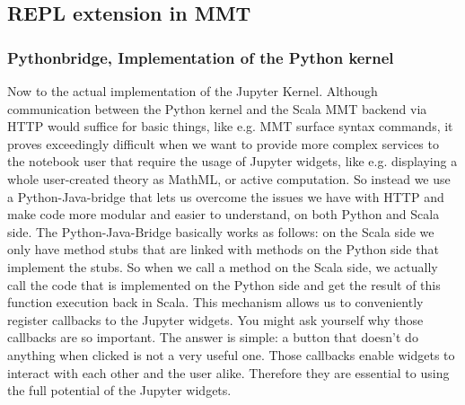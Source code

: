 \documentclass[book]{deliverablereport}
\begin{document}
\subsection{REPL extension in MMT}

\subsubsection{Pythonbridge, Implementation of the Python kernel}
Now to the actual implementation of the Jupyter Kernel. Although communication between 
the Python kernel and the Scala MMT backend via HTTP would suffice for basic things,
like e.g. MMT surface syntax commands, it proves exceedingly difficult when we want to 
provide more complex services to the notebook user that require the usage of Jupyter widgets,
like e.g. displaying a whole user-created theory as MathML, or active computation. 
So instead we use a Python-Java-bridge that lets us overcome the issues we have with HTTP and
make code more modular and easier to understand, on both Python and Scala side.
The Python-Java-Bridge basically works as follows: on the Scala side we only have method stubs
that are linked with methods on the Python side that implement the stubs. So when we call 
a method on the Scala side, we actually call the code that is implemented on the Python side 
and get the result of this function execution back in Scala. This mechanism allows us to 
conveniently register callbacks to the Jupyter widgets. You might ask yourself why those callbacks 
are so important. The answer is simple: a button that doesn't do anything when clicked is not 
a very useful one. Those callbacks enable widgets to interact with each other and the user alike. 
Therefore they are essential to using the full potential of the Jupyter widgets.
\end{document}
